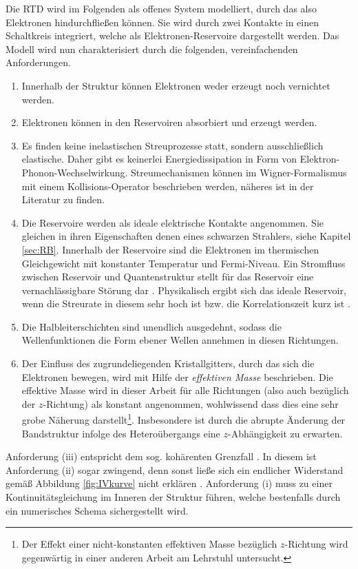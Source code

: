 Die RTD wird im Folgenden als offenes System modelliert, durch das also Elektronen hindurchfließen können. Sie wird durch zwei Kontakte in einen Schaltkreis integriert, welche als Elektronen-Reservoire dargestellt werden. Das Modell wird nun charakterisiert durch die folgenden, vereinfachenden Anforderungen.
\begin{enumerate}[label=(\roman*)]
  \item Innerhalb der Struktur können Elektronen weder erzeugt noch vernichtet werden.
  \item Elektronen können in den Reservoiren absorbiert und erzeugt werden.
  \item Es finden keine inelastischen Streuprozesse statt, sondern ausschließlich elastische. Daher gibt es keinerlei Energiedissipation in Form von Elektron-Phonon-Wechselwirkung. Streumechanismen können im Wigner-Formalismus mit einem Kollisions-Operator beschrieben werden, näheres ist in der Literatur \cite{wiedenhaus} zu finden.
  \item Die Reservoire werden als ideale elektrische Kontakte angenommen. Sie gleichen in ihren Eigenschaften denen eines schwarzen Strahlers, siehe Kapitel \ref{sec:RB}. Innerhalb der Reservoire sind die Elektronen im thermischen Gleichgewicht mit konstanter Temperatur und Fermi-Niveau. Ein Stromfluss zwischen Reservoir und Quantenstruktur stellt für das Reservoir eine vernachlässigbare Störung dar \cite{frensley3}. Physikalisch ergibt sich das ideale Reservoir, wenn die Streurate in diesem sehr hoch ist bzw. die Korrelationszeit kurz ist \cite{frensley3}.
  \item Die Halbleiterschichten sind unendlich ausgedehnt, sodass die Wellenfunktionen die Form ebener Wellen annehmen in diesen Richtungen.
  \item Der Einfluss des zugrundeliegenden Kristallgitters, durch das sich die Elektronen bewegen, wird mit Hilfe der \emph{effektiven Masse} beschrieben. Die effektive Masse wird in dieser Arbeit für alle Richtungen (also auch bezüglich der $z$-Richtung) als konstant angenommen, wohlwissend dass dies eine sehr grobe Näherung darstellt\footnote{Der Effekt einer nicht-konstanten effektiven Masse bezüglich $z$-Richtung wird gegenwärtig in einer anderen Arbeit am Lehrstuhl untersucht.}. Insbesondere ist durch die abrupte Änderung der Bandstruktur infolge des Heteroübergangs eine $z$-Abhängigkeit zu erwarten.
\end{enumerate}
Anforderung (iii) entspricht dem sog. kohärenten Grenzfall \cite{failure}. In diesem ist Anforderung (ii) sogar zwingend, denn sonst ließe sich ein endlicher Widerstand gemäß Abbildung \ref{fig:IVkurve} nicht erklären \cite{landauer}. Anforderung (i) muss zu einer Kontinuitätsgleichung im Inneren der Struktur führen, welche bestenfalls durch ein numerisches Schema sichergestellt wird. 

